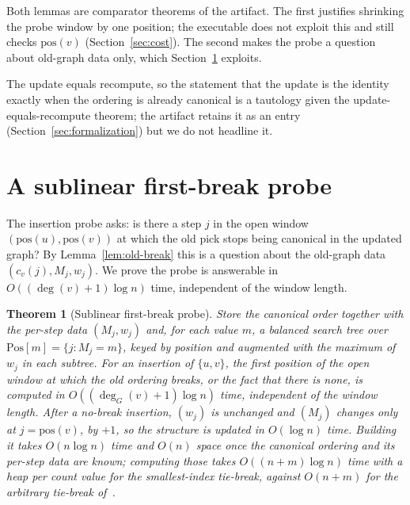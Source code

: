 \documentclass[11pt]{article}
\newtheorem{theorem}{Theorem}
\theoremstyle{definition}
\theoremstyle{remark}
\begin{document}
Both lemmas are comparator theorems of the artifact. The first justifies
shrinking the probe window by one position; the executable does not exploit
this and still checks $\mathrm{pos}(v)$ (Section~\ref{sec:cost}). The second
makes the probe a question about old-graph data only, which
Section~\ref{sec:probe} exploits.

The update equals recompute, so the statement that the update is the identity
exactly when the ordering is already canonical is a tautology given the
update-equals-recompute theorem; the artifact retains it as an entry
(Section~\ref{sec:formalization}) but we do not headline it.

\section{A sublinear first-break probe}
\label{sec:probe}

The insertion probe asks: is there a step $j$ in the open window
$(\mathrm{pos}(u),\mathrm{pos}(v))$ at which the old pick stops being canonical
in the updated graph? By Lemma~\ref{lem:old-break} this is a question about the
old-graph data $(c_v(j), M_j, w_j)$. We prove the probe is answerable in
$O((\deg(v)+1)\log n)$ time, independent of the window length.

\begin{theorem}[Sublinear first-break probe]
\label{thm:probe}
Store the canonical order together with the per-step data $(M_j, w_j)$ and, for
each value $m$, a balanced search tree over $\mathrm{Pos}[m]=\{j : M_j=m\}$,
keyed by position and augmented with the maximum of $w_j$ in each subtree. For
an insertion of $\{u,v\}$, the \emph{first} position of the open window at which
the old ordering breaks, or the fact that there is none, is computed in
$O((\deg_G(v)+1)\log n)$ time, independent of the window length. After a
no-break insertion, $(w_j)$ is unchanged and $(M_j)$ changes only at
$j=\mathrm{pos}(v)$, by $+1$, so the structure is updated in $O(\log n)$ time.
Building it takes $O(n\log n)$ time and $O(n)$ space once the canonical
ordering and its per-step data are known; computing those takes
$O((n+m)\log n)$ time with a heap per count value for the smallest-index
tie-break, against $O(n+m)$ for the arbitrary tie-break of~\cite{tarjan1984mcs}.
\end{theorem}
\end{document}
